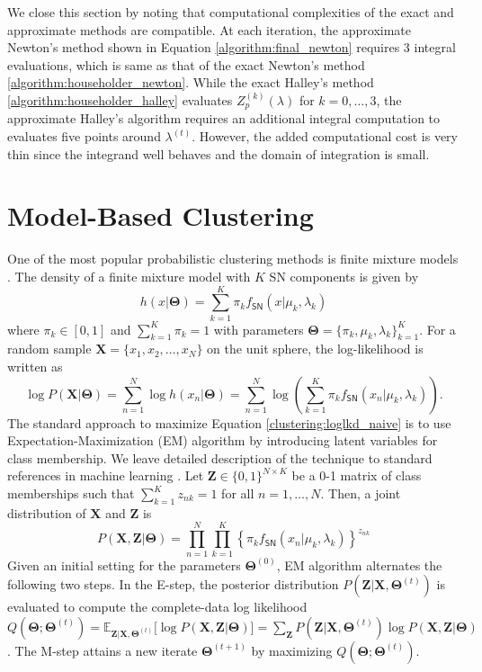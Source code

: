 \documentclass[11pt]{article}
\newcommand{\bbE}{\mathbb{E}}
\newcommand{\bfX}{\mathbf{X}}
\newcommand{\bfZ}{\mathbf{Z}}
\newcommand{\bfTheta}{\mathbf{\Theta}}
\begin{document}
We close this section by noting that computational complexities of the exact and approximate methods are compatible. At each iteration, the approximate Newton's method shown in Equation \eqref{algorithm:final_newton} requires 3 integral evaluations, which is same as that of the exact Newton's method \eqref{algorithm:householder_newton}. While the exact Halley's method \eqref{algorithm:householder_halley} evaluates $Z_p^{(k)} (\lambda)$ for $k = 0,\ldots,3$, the approximate Halley's algorithm requires an additional integral computation to evaluates five points around $\lambda^{(t)}$. However, the added computational cost is very thin since the integrand well behaves and the domain of integration is small. 




\section{Model-Based Clustering}\label{sec:clustering}

One of the most popular probabilistic clustering methods is finite mixture models \citep{mclachlan_finite_2019}. The density of a finite mixture model with $K$ SN components is given by
\begin{equation*}
h(x|\bfTheta) = \sum_{k=1}^K \pi_k f_{\textsf{SN}}(x|\mu_k,\lambda_k)
\end{equation*}
where $\pi_k \in [0,1]$ and $\sum_{k=1}^K \pi_k = 1$ with parameters $\bfTheta = \lbrace \pi_k, \mu_k, \lambda_k\rbrace_{k=1}^K$. For a random sample $\bfX = \lbrace x_1,x_2,\ldots,x_N\rbrace$ on the unit sphere, the log-likelihood is written as 
\begin{equation}\label{clustering:loglkd_naive}
\log P(\bfX|\bfTheta) = \sum_{n=1}^N \log h(x_n|\bfTheta) = \sum_{n=1}^N \log \left( \sum_{k=1}^K \pi_k f_{\textsf{SN}}(x_n|\mu_k,\lambda_k) \right).
\end{equation} The standard approach to maximize Equation \eqref{clustering:loglkd_naive} is to use Expectation-Maximization (EM) algorithm \citep{dempster_maximum_1977} by introducing latent variables for class membership. We leave detailed description of the technique to standard references in machine learning \citep{bishop_pattern_2006, hastie_elements_2009-1}. Let $\bfZ \in \lbrace 0, 1 \rbrace^{N\times K}$ be a 0-1 matrix of class memberships such that  $\sum_{k=1}^K z_{nk} = 1$ for all $n=1,\ldots,N$. Then, a joint distribution of $\bfX$ and $\bfZ$ is 
\begin{equation}\label{clustering:joint_density}
P(\bfX, \bfZ | \bfTheta) = \prod_{n=1}^{N} \prod_{k=1}^{K} \left\lbrace \pi_k f_{\textsf{SN}}(x_n\vert \mu_k, \lambda_k) \right\rbrace^{z_{nk}}
\end{equation}
Given an initial setting for the parameters $\bfTheta^{(0)}$, EM algorithm alternates the following two steps. In the E-step, the posterior distribution $P(\bfZ\vert \bfX, \bfTheta^{(t)})$ is evaluated to compute the complete-data log likelihood $Q(\bfTheta; \bfTheta^{(t)}) = \bbE_{\bfZ \vert \bfX, \bfTheta^{(t)}} \lbrack \log P(\bfX, \bfZ \vert \bfTheta)\rbrack = \sum_{\bfZ} P (\bfZ \vert \bfX, \bfTheta^{(t)}) \log P(\bfX, \bfZ \vert \bfTheta)$. The M-step attains a new iterate $\bfTheta^{(t+1)}$ by maximizing $Q(\bfTheta; \bfTheta^{(t)})$. 
\end{document}
